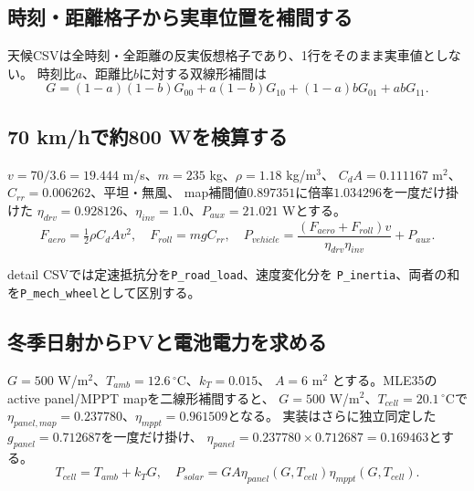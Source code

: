 
\subsection{時刻・距離格子から実車位置を補間する}
天候CSVは全時刻・全距離の反実仮想格子であり、1行をそのまま実車値としない。
時刻比$a$、距離比$b$に対する双線形補間は
\[
G=(1-a)(1-b)G_{00}+a(1-b)G_{10}+(1-a)bG_{01}+abG_{11}.
\]

\subsection{70 km/hで約800 Wを検算する}
$v=70/3.6=19.444$ m/s、$m=235$ kg、$\rho=1.18$ kg/m$^3$、
$C_dA=0.111167$ m$^2$、$C_{rr}=0.006262$、平坦・無風、
map補間値$0.897351$に倍率$1.034296$を一度だけ掛けた
$\eta_{drv}=0.928126$、$\eta_{inv}=1.0$、$P_{aux}=21.021$ Wとする。
\[
F_{aero}=\tfrac12\rho C_dAv^2,\quad F_{roll}=mgC_{rr},\quad
P_{vehicle}=\frac{(F_{aero}+F_{roll})v}{\eta_{drv}\eta_{inv}}+P_{aux}.
\]

detail CSVでは定速抵抗分を\texttt{P\_road\_load}、速度変化分を
\texttt{P\_inertia}、両者の和を\texttt{P\_mech\_wheel}として区別する。

\subsection{冬季日射からPVと電池電力を求める}
$G=500$ W/m$^2$、$T_{amb}=12.6\,^{\circ}$C、$k_T=0.015$、
$A=6$ m$^2$ とする。MLE35のactive panel/MPPT mapを二線形補間すると、
$G=500$ W/m$^2$、$T_{cell}=20.1\,^{\circ}$Cで
$\eta_{panel,map}=0.237780$、$\eta_{mppt}=0.961509$となる。
実装はさらに独立同定した$g_{panel}=0.712687$を一度だけ掛け、
$\eta_{panel}=0.237780\times0.712687=0.169463$とする。
\[
T_{cell}=T_{amb}+k_TG,\quad
P_{solar}=GA\eta_{panel}(G,T_{cell})\eta_{mppt}(G,T_{cell}).
\]

